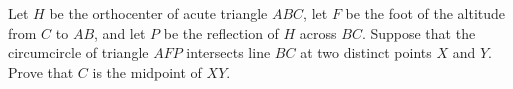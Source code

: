 Let $H$ be the orthocenter of acute triangle $ABC$, let $F$ be the foot of the altitude from $C$ to $AB$, and let $P$ be the reflection of $H$ across $BC$. Suppose that the circumcircle of triangle $AFP$ intersects line $BC$ at two distinct points $X$ and $Y$. Prove that $C$ is the midpoint of $XY$.